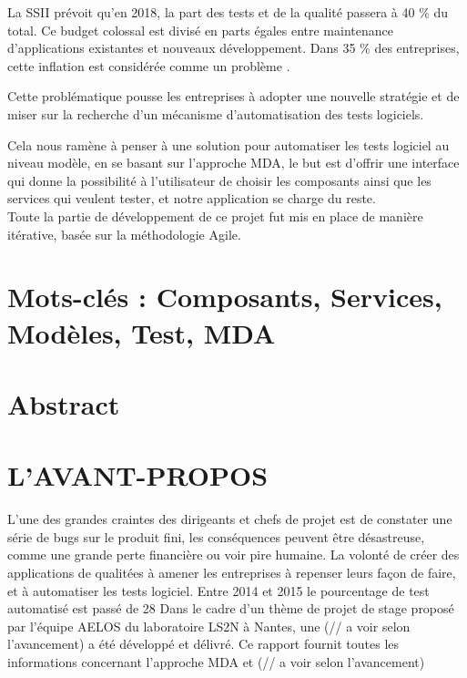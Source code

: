 \documentclass[
10pt, %
a4paper, %
oneside, %
headinclude,footinclude, %
BCOR5mm, %
]{report}
\begin{document}
	La SSII prévoit qu’en 2018, la part des tests et de la qualité passera à 40 \% du total. Ce budget colossal est divisé en parts égales entre maintenance d’applications existantes et nouveaux développement. Dans 35 \% des entreprises, cette inflation est considérée comme un problème \citep{silicon}.
														
	Cette problématique pousse les entreprises à adopter une nouvelle stratégie et de miser sur la recherche d’un mécanisme d’automatisation des tests logiciels.
														
	Cela nous ramène à penser à une solution pour automatiser les tests logiciel au niveau modèle, en se basant sur l’approche MDA, le but est d’offrir une interface qui donne la possibilité à l’utilisateur de choisir les composants ainsi que les services qui veulent tester, et notre application se charge du reste.\\
														
	Toute la partie de développement de ce projet fut mis en place de manière itérative, basée sur la méthodologie Agile.
	\section*{Mots-clés : Composants, Services, Modèles, Test, MDA}
														
	\newpage
	\section*{Abstract} 
	\lipsum[1]
								  
								
								
	\newpage
	\section*{L’AVANT-PROPOS} 
	L’une des grandes craintes des dirigeants et chefs de projet est de constater une série de bugs sur le produit fini, les conséquences peuvent être désastreuse, comme une grande perte financière ou voir pire humaine.  
	La volonté de créer des applications de qualitées à amener les entreprises à repenser leurs façon de faire, et à automatiser les tests logiciel. Entre 2014 et 2015 le pourcentage de test automatisé est passé de 28%
	Dans le cadre d’un thème de projet de stage proposé par l’équipe AELOS du laboratoire LS2N à Nantes, une (// a voir selon l’avancement) a été développé et délivré. 
	Ce rapport fournit toutes les informations concernant l’approche MDA et (// a voir selon l’avancement)
								 
\end{document}
